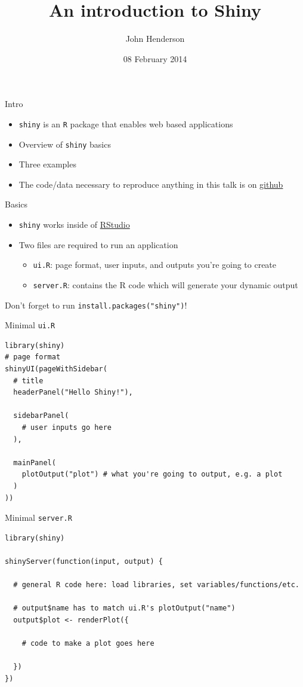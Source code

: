 \documentclass[sans,aspectratio=169,presentation,bigger,fleqn]{beamer}
\author{John Henderson}
\date{08 February 2014}
\title{An introduction to Shiny}
\begin{document}
\maketitle

\begin{frame}[fragile,label=sec-1]{Intro}
 \begin{itemize}
\item \texttt{shiny} is an \texttt{R} package that enables web based applications
\item Overview of \texttt{shiny} basics
\item Three examples
\item The code/data necessary to reproduce anything in this talk is on \href{https://github.com/jwhendy/devFest-shiny}{github}
\end{itemize}
\end{frame}
\begin{frame}[fragile,label=sec-2]{Basics}
 \begin{itemize}
\item \texttt{shiny} works inside of \href{http://www.rstudio.com/}{RStudio}
\item Two files are required to run an application
\begin{itemize}
\item \texttt{ui.R}: page format, user inputs, and outputs you're going to create
\item \texttt{server.R}: contains the R code which will generate your dynamic output
\end{itemize}
\end{itemize}

\vspace{0.5cm}

Don't forget to run \texttt{install.packages("shiny")}!
\end{frame}
\begin{frame}[fragile,label=sec-3]{Minimal \texttt{ui.R}}
 \scriptsize
\begin{verbatim}
library(shiny)
# page format
shinyUI(pageWithSidebar(
  # title
  headerPanel("Hello Shiny!"),

  sidebarPanel(
    # user inputs go here
  ),

  mainPanel(
    plotOutput("plot") # what you're going to output, e.g. a plot
  )
))
\end{verbatim}
\scriptsize
\end{frame}
\begin{frame}[fragile,label=sec-4]{Minimal \texttt{server.R}}
 \scriptsize
\begin{verbatim}
library(shiny)

shinyServer(function(input, output) {

  # general R code here: load libraries, set variables/functions/etc.

  # output$name has to match ui.R's plotOutput("name")
  output$plot <- renderPlot({

    # code to make a plot goes here

  })
})
\end{verbatim}
\scriptsize
\end{frame}
\end{document}
